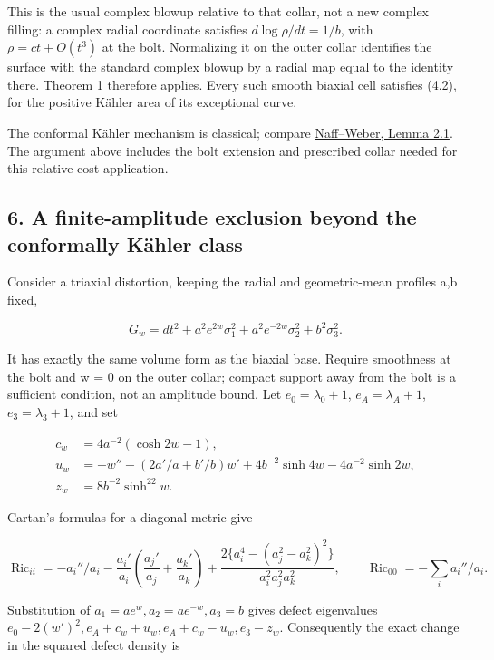 \documentclass[
  10pt,
]{article}
\begin{document}
This is the usual complex blowup relative to that collar, not a new
complex filling: a complex radial coordinate satisfies
\(d\log\rho/dt=1/b\), with \(\rho=ct+O(t^3)\) at the bolt. Normalizing
it on the outer collar identifies the surface with the standard complex
blowup by a radial map equal to the identity there. Theorem 1 therefore
applies. Every such smooth biaxial cell satisfies (4.2), for the
positive Kähler area of its exceptional curve.

The conformal Kähler mechanism is classical; compare
\href{https://arxiv.org/pdf/2111.11150}{Naff--Weber, Lemma 2.1}. The
argument above includes the bolt extension and prescribed collar needed
for this relative cost application.

\hypertarget{a-finite-amplitude-exclusion-beyond-the-conformally-kuxe4hler-class}{%
\subsection{6. A finite-amplitude exclusion beyond the conformally
Kähler
class}\label{a-finite-amplitude-exclusion-beyond-the-conformally-kuxe4hler-class}}

Consider a triaxial distortion, keeping the radial and geometric-mean
profiles a,b fixed,

\[
 G_w=dt^2+a^2e^{2w}\sigma_1^2+a^2e^{-2w}\sigma_2^2+b^2\sigma_3^2.
\]

It has exactly the same volume form as the biaxial base. Require
smoothness at the bolt and w = 0 on the outer collar; compact support
away from the bolt is a sufficient condition, not an amplitude bound.
Let \(e_0=\lambda_0+1\), \(e_A=\lambda_A+1\), \(e_3=\lambda_3+1\), and
set

\[
\begin{aligned}
 c_w&=4a^{-2}(\cosh 2w-1),\\
 u_w&=-w''-(2a'/a+b'/b)w'+4b^{-2}\sinh4w-4a^{-2}\sinh2w,\\
 z_w&=8b^{-2}\sinh^22w.
\end{aligned}
\]

Cartan's formulas for a diagonal metric give

\[
 \operatorname{Ric}_{ii}=-a_i''/a_i
 -\frac{a_i'}{a_i}\left(\frac{a_j'}{a_j}+\frac{a_k'}{a_k}\right)
 +\frac{2\{a_i^4-(a_j^2-a_k^2)^2\}}{a_i^2a_j^2a_k^2},
 \qquad \operatorname{Ric}_{00}=-\sum_i a_i''/a_i.
\]

Substitution of \(a_1=ae^w,a_2=ae^{-w},a_3=b\) gives defect eigenvalues
\(e_0-2(w')^2,e_A+c_w+u_w,e_A+c_w-u_w,e_3-z_w\). Consequently the exact
change in the squared defect density is
\end{document}
